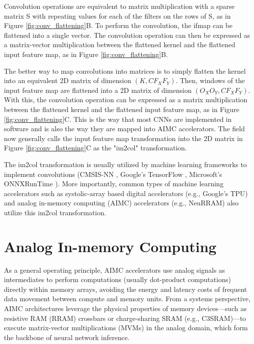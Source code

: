 Convolution operations are equivalent to matrix multiplication with a sparse matrix S with repeating values for each of the filters on the rows of S, as in Figure \ref{fig:conv_flattening}B. To perform the convolution, the ifmap can be flattened into a single vector. The convolution operation can then be expressed as a matrix-vector multiplication between the flattened kernel and the flattened input feature map, as in Figure \ref{fig:conv_flattening}B. 

The better way to map convolutions into matrices is to simply flatten the kernel into an equivalent 2D matrix of dimension $(K,CF_XF_Y)$. Then, windows of the input feature map are flattened into a 2D matrix of dimension $(O_XO_Y,CF_XF_Y)$. With this, the convolution operation can be expressed as a matrix multiplication between the flattened kernel and the flattened input feature map, as in Figure \ref{fig:conv_flattening}C. This is the way that most CNNs are implemented in software and is also the way they are mapped into AIMC accelerators. The field now generally calls the input feature map transformation into the 2D matrix in Figure \ref{fig:conv_flattening}C as the "im2col" transformation.

The im2col transformation is usually utilized by machine learning frameworks to implement convolutions (CMSIS-NN \cite{lai2018cmsis}, Google's TensorFlow \cite{jacob2018quantization}, Microsoft's ONNXRunTime \cite{onnxruntime} ). More importantly, common types of machine learning accelerators such as systolic-array based digital accelerators (e.g., Google's TPU) \cite{jouppi2017datacenter} and analog in-memory computing (AIMC) accelerators (e.g., NeuRRAM) \cite{wanneurram} also utilize this im2col transformation.

\section{Analog In-memory Computing} 
 
As a general operating principle, AIMC accelerators use analog signals as intermediates to perform computations (usually dot-product computations) directly within memory arrays, avoiding the energy and latency costs of frequent data movement between compute and memory units. From a systems perspective, AIMC architectures leverage the physical properties of memory devices—such as resistive RAM (RRAM) crossbars or charge-sharing SRAM (e.g., C3SRAM)—to execute matrix-vector multiplications (MVMs) in the analog domain, which form the backbone of neural network inference.

